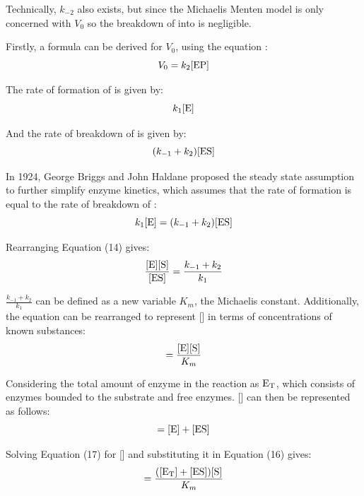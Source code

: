 \documentclass{article}
\begin{document}
\medskip

Technically, $k_{-2}$ also exists, but since the Michaelis Menten model is only concerned with $V_0$ so the breakdown of  into  is negligible.

\medskip

Firstly, a formula can be derived for $V_0$, using the equation :
\begin{equation}
    V_0 = k_2 [\ce{EP}]
\end{equation}

The rate of formation of  is given by:
\begin{equation}
    k_1 [\ce{E}]
\end{equation}

And the rate of breakdown of  is given by:
\begin{equation}
    (k_{-1} + k_2) [\ce{ES}]
\end{equation}

In 1924, George Briggs and John Haldane proposed the steady state assumption to further simplify enzyme kinetics, which assumes that the rate of formation is equal to the rate of breakdown of :
\begin{equation}
    k_1 [\ce{E}] = (k_{-1} + k_2) [\ce{ES}]
\end{equation}

Rearranging Equation (14) gives:
\begin{equation}
    \frac{[\ce{E}][\ce{S}]}{[\ce{ES}]} = \frac{k_{-1}+k_2}{k_1}
\end{equation}

$\frac{k_{-1}+k_2}{k_1}$ can be defined as a new variable $K_m$, the Michaelis constant. Additionally, the equation can be rearranged to represent [] in terms of concentrations of known substances:
\begin{equation}
    [\ce{ES}] = \frac{[\ce{E}][\ce{S}]}{K_m}
\end{equation}

Considering the total amount of enzyme in the reaction as $\ce{E_T}$, which consists of enzymes bounded to the substrate and free enzymes. [] can then be represented as follows:
\begin{equation}
    [\ce{E_T}] = [\ce{E}] + [\ce{ES}]
\end{equation}

Solving Equation (17) for [] and substituting it in Equation (16) gives:
\begin{equation}
    [\ce{ES}] = \frac{([\ce{E_T}] + [\ce{ES}]) [\ce{S}]}{K_m}
\end{equation}
\end{document}
